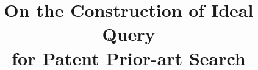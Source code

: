 \documentclass{sig-alternate}
\begin{document}
%

\title{On the Construction of Ideal Query\\ for Patent Prior-art Search
}
%
%
%
%
%
\end{document}

